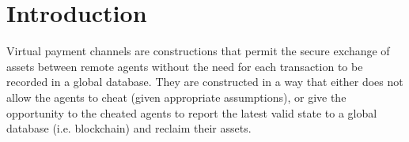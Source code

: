 \section{Introduction}
  Virtual payment channels are constructions that permit the secure exchange of assets
  between remote agents without the need for each transaction to be recorded in a global
  database. They are constructed in a way that either does not allow the agents to cheat
  (given appropriate assumptions), or give the opportunity to the cheated agents to report
  the latest valid state to a global database (i.e. blockchain) and reclaim their assets.
